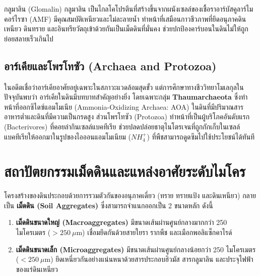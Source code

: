 \begin{definitionbox}{กลูมาลิน (Glomalin)}
กลูมาลิน เป็นไกลโคโปรตีนที่สร้างขึ้นจากผนังเซลล์ของเชื้อราอาร์บัสคูลาร์ไมคอร์ไรซา (AMF) มีคุณสมบัติเหนียวและไม่ละลายน้ำ ทำหน้าที่เสมือนกาวชีวภาพที่ยึดอนุภาคดินเหนียว ดินทราย และอินทรียวัตถุเข้าด้วยกันเป็นเม็ดดินที่มั่นคง ช่วยปกป้องคาร์บอนในดินไม่ให้ถูกย่อยสลายเร็วเกินไป
\end{definitionbox}

\subsection{อาร์เคียและโพรโทซัว (Archaea and Protozoa)}
ในอดีตเชื่อว่าอาร์เคียอาศัยอยู่เฉพาะในสภาวะแวดล้อมสุดขั้ว แต่การศึกษาทางชีววิทยาโมเลกุลในปัจจุบันพบว่า อาร์เคียในดินมีบทบาทสำคัญอย่างยิ่ง โดยเฉพาะกลุ่ม \textbf{Thaumarchaeota} ซึ่งทำหน้าที่ออกซิไดซ์แอมโมเนีย (Ammonia-Oxidizing Archaea: AOA) ในดินที่มีปริมาณสารอาหารต่ำและดินที่มีความเป็นกรดสูง ส่วนโพรโทซัว (Protozoa) ทำหน้าที่เป็นผู้บริโภคอันดับแรก (Bacterivores) ที่คอยล่ากินเซลล์แบคทีเรีย ช่วยปลดปล่อยธาตุไนโตรเจนที่ถูกกักเก็บในเซลล์แบคทีเรียให้ออกมาในรูปของไอออนแอมโมเนียม ($NH_4^+$) ที่พืชสามารถดูดซึมไปใช้ประโยชน์ได้ทันที

\section{สถาปัตยกรรมเม็ดดินและแหล่งอาศัยระดับไมโคร}

โครงสร้างของดินประกอบด้วยการรวมตัวกันของอนุภาคเดี่ยว (ทราย ทรายแป้ง และดินเหนียว) กลายเป็น \textbf{เม็ดดิน (Soil Aggregates)} ซึ่งสามารถจำแนกออกเป็น 2 ขนาดหลัก ดังนี้
\begin{enumerate}
    \item \textbf{เม็ดดินขนาดใหญ่ (Macroaggregates)} มีขนาดเส้นผ่านศูนย์กลางมากกว่า 250 ไมโครเมตร ($>250\ \mu\text{m}$) เชื่อมยึดกันด้วยสายใยรา รากพืช และเมือกพอลิแซ็กคาไรด์
    \item \textbf{เม็ดดินขนาดเล็ก (Microaggregates)} มีขนาดเส้นผ่านศูนย์กลางน้อยกว่า 250 ไมโครเมตร ($<250\ \mu\text{m}$) ยึดเหนี่ยวกันอย่างแน่นหนาด้วยสารประกอบฮิวมัส สารกลูมาลิน และประจุไฟฟ้าของแร่ดินเหนียว
\end{enumerate}

